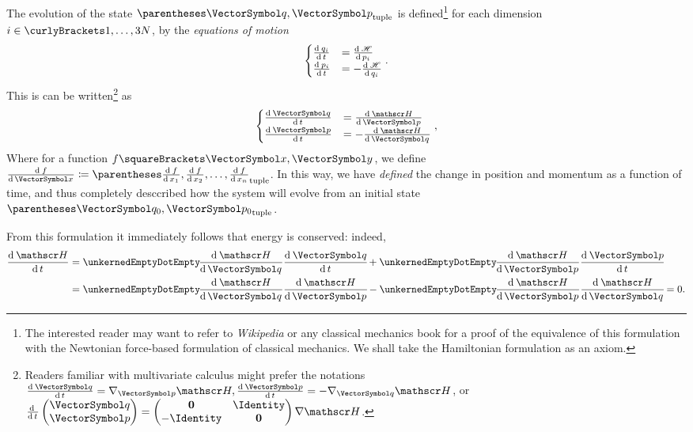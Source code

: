 \documentclass[10pt, a4paper, twoside]{basestyle}
\begin{document}
The evolution of the state $\tuple{\vq, \vp}$ is defined\footnote{The interested
reader may want to refer to \emph{Wikipedia} or any classical mechanics book for
a proof of the equivalence of this formulation with the Newtonian force-based
formulation of classical mechanics. We shall take the Hamiltonian formulation as
an axiom.} for each dimension $i\in\set{1,\dotsc,3N}$, by the \emph{equations of
motion}
\[
\begin{cases}
\deriv t {q_i} &= \deriv {p_i} \Hamiltonian \\
\deriv t {p_i} &= -\deriv {q_i} \Hamiltonian
\end{cases}.
\]
This is can be written\footnote{Readers familiar with multivariate calculus
might prefer the notations $\deriv t {\vq} = \grad_{\vp} \Hamiltonian,
\deriv t {\vp} = -\grad_{\vq} \Hamiltonian$, or $\derivop t 
\begin{pmatrix}
\vq \\
\vp
\end{pmatrix} =
\begin{pmatrix}
\nullmat    & \Identity \\
-\Identity & \nullmat
\end{pmatrix}
\grad \Hamiltonian$.}
as
\[
\begin{cases}
\deriv t {\vq} &= \deriv {\vp} \Hamiltonian \\
\deriv t {\vp} &= -\deriv {\vq} \Hamiltonian
\end{cases},
\]
Where for a function $f\of{\vx, \vy}$, we define $\deriv \vx f\DefineAs \tuple{\deriv {x_1} f, \deriv {x_2} f, \dotsc, \deriv {x_n} f}$.
In this way, we have \emph{defined} the change in position and momentum as a
function of time, and thus completely desccribed how the system will evolve from
an initial state $\tuple{\vq_0, \vp_0}$.

From this formulation it immediately follows that energy is conserved:
indeed,
\begin{align*}
\deriv t \Hamiltonian &= \scal{\deriv \vq \Hamiltonian}{\deriv t \vq}
    + \scal{\deriv \vp \Hamiltonian}{\deriv t \vp} \\
&= \scal{\deriv \vq \Hamiltonian}{\deriv \vp \Hamiltonian}
    - \scal{\deriv \vp \Hamiltonian}{\deriv \vq \Hamiltonian} = 0.
\end{align*}
\end{document}
